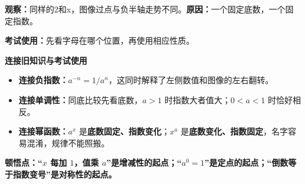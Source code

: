 \clearpage
\begin{explanationbox}


\textbf{观察：}同样的2和x，图像过点与负半轴走势不同。\quad\textbf{原因：}一个固定底数，一个固定指数。

\textbf{考试使用：}先看字母在哪个位置，再使用相应性质。

\textbf{\textcolor{CExplanation}{连接旧知识与考试使用}}
\begin{itemize}[leftmargin=*,itemsep=0.4em,topsep=0.3em]
  \item \textbf{连接负指数：}$a^{-n}=1/a^n$，这同时解释了左侧数值和图像的左右翻转。
  \item \textbf{连接单调性：}同底比较先看底数，$a>1$ 时指数大者值大；$0<a<1$ 时恰好相反。
  \item \textbf{连接幂函数：}$a^x$ 是\textbf{底数固定、指数变化}；$x^a$ 是\textbf{底数变化、指数固定}，名字容易混淆，规律不能照搬。
\end{itemize}

\textbf{\textcolor{CExplanation}{顿悟点：}}\textbf{“$x$ 每加 $1$，值乘 $a$”是增减性的起点；“$a^0=1$”是定点的起点；“倒数等于指数变号”是对称性的起点。}

\end{explanationbox}
